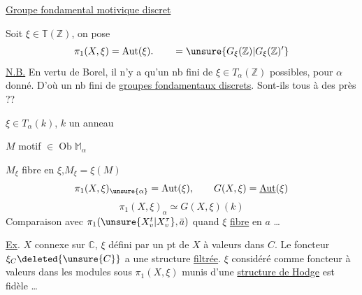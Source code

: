 \uline{Groupe fondamental motivique discret}

Soit $\xi\in\mathbb T(\mathbb Z)$, on pose
\[
\pi_1(X,\xi)=\operatorname{Aut}(\xi).
\qquad =\unsure{G_\xi(\mathbb Z)|G_\xi(\mathbb Z)'}
\]
\uline{N.B.} En vertu de Borel, il n'y a qu'un
nb fini de $\xi\in T_\alpha(\mathbb Z)$ possibles, pour $\alpha$
donné. D'où un nb fini de \uline{groupes
fondamentaux discrets}. Sont-ils tous
 à des  près ??

$\xi\in T_\alpha(k)$, $k$ un anneau

$M$ motif $\in\operatorname{Ob}\mathbb M_\alpha$

$M_\xi$ fibre en $\xi$,\qquad $M_\xi=\xi(M)$
\[
\pi_1(X,\xi)_{\unsure{\alpha}}=\operatorname{Aut}(\xi),\qquad
G(X,\xi)=\underline{\operatorname{Aut}}(\xi)
\]
\[
\pi_1(X,\xi)_\alpha\simeq G(X,\xi)(k)
\]
Comparaison avec $\pi_1(\unsure{X^t_v|X^\tau_v},\bar a)$ quand $\xi$ 
\uline{fibre} en $a$ \ldots

\uline{Ex}. $X$ connexe sur $\mathbb C$, $\xi$ défini par un pt de
$X$ à valeurs dans $C$. Le foncteur $\xi_C\deleted{\unsure{C}}$ a une
structure \uline{filtrée}. $\xi$ considéré comme
foncteur à valeurs dans les modules
sous $\pi_1(X,\xi)$ munis d'une \uline{structure de
Hodge} est  fidèle \ldots
